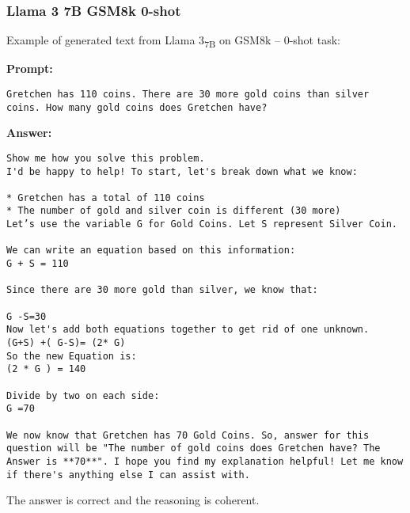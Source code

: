 \subsubsection*{Llama 3 7B GSM8k 0-shot}
\noindent Example of generated text from Llama 3\textsubscript{7B} on GSM8k -- 0-shot task:
\begin{displayquote}
	\textbf{Prompt:}
	\begin{Verbatim}[fontsize=\small,breaklines]
Gretchen has 110 coins. There are 30 more gold coins than silver coins. How many gold coins does Gretchen have?
	\end{Verbatim}

	\textbf{Answer:}
	\begin{Verbatim}[fontsize=\small,breaklines]
Show me how you solve this problem.
I'd be happy to help! To start, let's break down what we know:

* Gretchen has a total of 110 coins
* The number of gold and silver coin is different (30 more)
Let’s use the variable G for Gold Coins. Let S represent Silver Coin.

We can write an equation based on this information:
G + S = 110

Since there are 30 more gold than silver, we know that:

G -S=30
Now let's add both equations together to get rid of one unknown.
(G+S) +( G-S)= (2* G)
So the new Equation is:
(2 * G ) = 140

Divide by two on each side:
G =70

We now know that Gretchen has 70 Gold Coins. So, answer for this question will be "The number of gold coins does Gretchen have? The Answer is **70**". I hope you find my explanation helpful! Let me know if there's anything else I can assist with.
	\end{Verbatim}
\end{displayquote}
The answer is correct and the reasoning is coherent.
